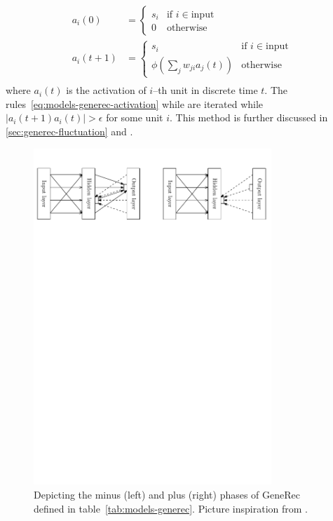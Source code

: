 \begin{align}
  \label{eq:models-generec-activation}
  a_i(0) &= \left\{
	\begin{array}{ll}
		s_i & \mbox{if } i \in \mbox{input} \nonumber \\
		0 & \mbox{otherwise} \nonumber 
	\end{array}
\right. \\
  a_i(t+1) &= \left\{
	\begin{array}{ll}
		s_i & \mbox{if } i \in \mbox{input} \nonumber \\
		\phi(\sum_j w_{ji}a_j(t)) & \mbox{otherwise} \nonumber 
	\end{array}
\right. \\
\end{align} 
where $a_i(t)$ is the activation of $i$--th unit in discrete time $t$. The rules~\ref{eq:models-generec-activation} while are iterated while $|a_i(t+1) a_i(t)| > \epsilon$ for some unit $i$. This method is further discussed in \ref{sec:generec-fluctuation} and \citep{orru2008sabio}.

\begin{figure}[H]
  \centering
  \includegraphics[width=0.8\textwidth]{img/models-generec-phase.pdf}
  
  \caption{Depicting the minus (left) and plus (right) phases of GeneRec defined in table~\ref{tab:models-generec}. Picture inspiration from \citet{orru2008sabio}.} 
  \label{fig:models-generec-phase}
\end{figure}

